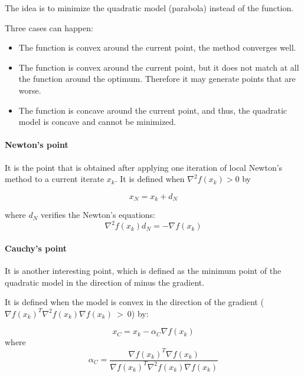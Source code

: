 The idea is to minimize the quadratic model (parabola) instead of the function.

Three cases can happen:
\begin{itemize}
    \item The function is convex around the current point, the method converges well.
    \item The function is convex around the current point, but it does not match at all the function around the optimum. Therefore it may generate points that are worse.
    \item The function is concave around the current point, and thus, the quadratic model is concave and cannot be minimized.
\end{itemize}

\paragraph{Newton's point} It is the point that is obtained after applying one iteration of local Newton's method to a current iterate $x_k$.
It is defined when $\nabla^2 f(x_k) > 0$ by

\begin{equation}
    x_N = x_k + d_N
\end{equation}

where $d_N$ verifies the Newton's equations:
\begin{equation}
    \nabla^2 f(x_k) d_N = -\nabla f(x_k)
\end{equation}

\paragraph{Cauchy's point} It is another interesting point, which is defined as the minimum point of the  quadratic model in the direction of minus the gradient. 

It is defined when the model is convex in the direction of the gradient ($\nabla f(x_k)^T \nabla^2 f(x_k) \nabla f(x_k)~>~0$) by:

\begin{equation}
    x_C = x_k - \alpha_C \nabla f(x_k)
\end{equation}
where 
\begin{equation}
    \alpha_C = \frac{\nabla f(x_k)^T\nabla f(x_k)}{\nabla f(x_k)^T\nabla^2 f(x_k) \nabla f(x_k)}
\end{equation}

